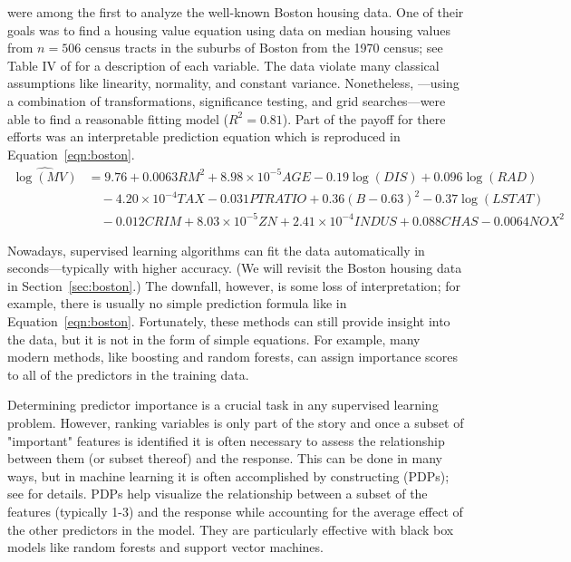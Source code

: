 \citet{harrison-1978-hedonic} were among the first to analyze the well-known Boston housing data. One of their goals was to find a housing value equation using data on median housing values from $n = 506$ census tracts in the suburbs of Boston from the 1970 census; see Table IV of \citet{harrison-1978-hedonic} for a description of each variable. The data violate many classical assumptions like linearity, normality, and constant variance. Nonetheless, \citeauthor{harrison-1978-hedonic}---using a combination of transformations, significance testing, and grid searches---were able to find a reasonable fitting model ($R^2 = 0.81$). Part of the payoff for there efforts was an interpretable prediction equation which is reproduced in Equation~\eqref{eqn:boston}.
\begin{equation}
\label{eqn:boston}
\begin{split}
\widehat{\log\left(MV\right)} &= 9.76 + 0.0063 RM^2 + 8.98\times10^{-5} AGE - 0.19\log\left(DIS\right) + 0.096\log\left(RAD\right) \\
  & \quad - 4.20\times10^{-4} TAX - 0.031 PTRATIO + 0.36\left(B - 0.63\right)^2 - 0.37\log\left(LSTAT\right) \\
  & \quad - 0.012 CRIM + 8.03\times10^{-5} ZN + 2.41\times10^{-4} INDUS + 0.088 CHAS - 0.0064 NOX^2
\end{split}
\end{equation}

Nowadays, supervised learning algorithms can fit the data automatically in seconds---typically with higher accuracy. (We will revisit the Boston housing data in Section~\ref{sec:boston}.) The downfall, however, is some loss of interpretation; for example, there is usually no simple prediction formula like in Equation~\eqref{eqn:boston}. Fortunately, these methods can still provide insight into the data, but it is not in the form of simple equations. For example, many modern methods, like boosting and random forests, can assign importance scores to all of the predictors in the training data.

Determining predictor importance is a crucial task in any supervised learning problem. However, ranking variables is only part of the story and once a subset of "important" features is identified it is often necessary to assess the relationship between them (or subset thereof) and the response. This can be done in many ways, but in machine learning it is often accomplished by constructing  (PDPs); see \citet{friedman-2001-greedy} for details. PDPs help visualize the relationship between a subset of the features (typically 1-3) and the response while accounting for the average effect of the other predictors in the model. They are particularly effective with black box models like random forests and support vector machines.

